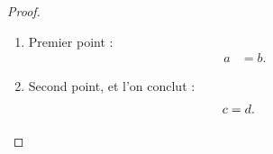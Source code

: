 \begin{proof}
  \begin{enumerate}
    \item Premier point :
      \begin{align*}
        a &= b.
      \end{align*}
    \item Second point, et l'on conclut :
      \begin{align*}
        c &= d. \qedhere
      \end{align*}
  \end{enumerate}
\end{proof}
